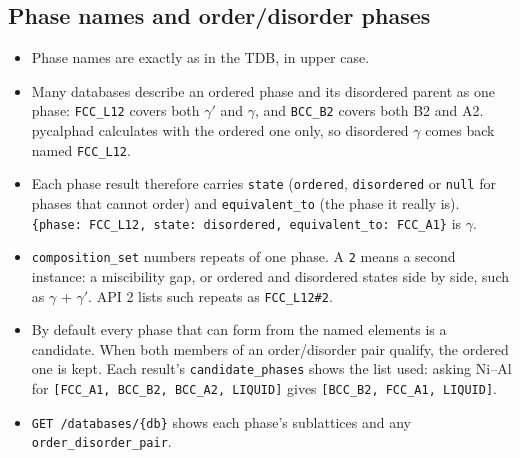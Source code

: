 \documentclass[12pt,a4paper]{article}
\begin{document}
\subsection*{Phase names and order/disorder phases}
\begin{itemize}
\item Phase names are exactly as in the TDB, in upper case.
\item Many databases describe an ordered phase and its disordered parent as one phase: \texttt{FCC\_\allowbreak{}L12} covers both \(\gamma '\) and \(\gamma\), and \texttt{BCC\_\allowbreak{}B2} covers both B2 and A2. pycalphad calculates with the ordered one only, so disordered \(\gamma\) comes back named \texttt{FCC\_\allowbreak{}L12}.
\item Each phase result therefore carries \texttt{state} (\texttt{\textquotedbl{}ordered\textquotedbl{}}, \texttt{\textquotedbl{}disordered\textquotedbl{}} or \texttt{null} for phases that cannot order) and \texttt{equivalent\_\allowbreak{}to} (the phase it really is). \texttt{\{\textquotedbl{}phase\textquotedbl{}: \textquotedbl{}FCC\_\allowbreak{}L12\textquotedbl{},\allowbreak{} \textquotedbl{}state\textquotedbl{}: \textquotedbl{}disordered\textquotedbl{},\allowbreak{} \textquotedbl{}equivalent\_\allowbreak{}to\textquotedbl{}: \textquotedbl{}FCC\_\allowbreak{}A1\textquotedbl{}\}} is \(\gamma\).
\item \texttt{composition\_\allowbreak{}set} numbers repeats of one phase. A \texttt{2} means a second instance: a miscibility gap, or ordered and disordered states side by side, such as \(\gamma\) + \(\gamma '\). API 2 lists such repeats as \texttt{\textquotedbl{}FCC\_\allowbreak{}L12\#2\textquotedbl{}}.
\item By default every phase that can form from the named elements is a candidate. When both members of an order/disorder pair qualify, the ordered one is kept. Each result's \texttt{candidate\_\allowbreak{}phases} shows the list used: asking Ni--Al for \texttt{[\textquotedbl{}FCC\_\allowbreak{}A1\textquotedbl{},\allowbreak{} \textquotedbl{}BCC\_\allowbreak{}B2\textquotedbl{},\allowbreak{} \textquotedbl{}BCC\_\allowbreak{}A2\textquotedbl{},\allowbreak{} \textquotedbl{}LIQUID\textquotedbl{}]} gives \texttt{[\textquotedbl{}BCC\_\allowbreak{}B2\textquotedbl{},\allowbreak{} \textquotedbl{}FCC\_\allowbreak{}A1\textquotedbl{},\allowbreak{} \textquotedbl{}LIQUID\textquotedbl{}]}.
\item \texttt{GET /\allowbreak{}databases/\allowbreak{}\{db\}} shows each phase's sublattices and any \texttt{order\_\allowbreak{}disorder\_\allowbreak{}pair}.
\end{itemize}
\end{document}

